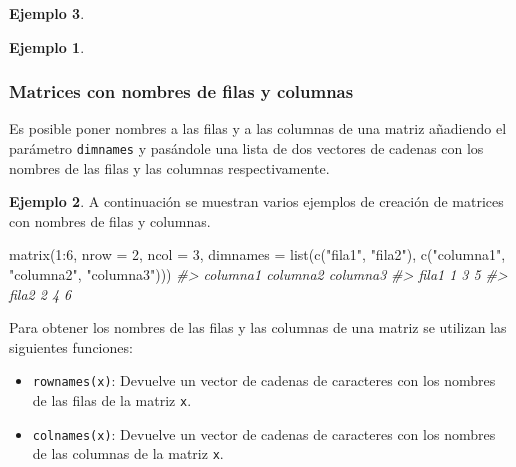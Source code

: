 \documentclass[
]{book}
\newenvironment{Shaded}{\begin{snugshade}}{\end{snugshade}}
\newcommand{\AttributeTok}[1]{\textcolor[rgb]{0.77,0.63,0.00}{#1}}
\newcommand{\CommentTok}[1]{\textcolor[rgb]{0.56,0.35,0.01}{\textit{#1}}}
\newcommand{\DecValTok}[1]{\textcolor[rgb]{0.00,0.00,0.81}{#1}}
\newcommand{\FunctionTok}[1]{\textcolor[rgb]{0.00,0.00,0.00}{#1}}
\newcommand{\NormalTok}[1]{#1}
\newcommand{\SpecialCharTok}[1]{\textcolor[rgb]{0.00,0.00,0.00}{#1}}
\newcommand{\StringTok}[1]{\textcolor[rgb]{0.31,0.60,0.02}{#1}}
\providecommand{\tightlist}{%
  \setlength{\itemsep}{0pt}\setlength{\parskip}{0pt}}
\theoremstyle{definition}
\theoremstyle{definition}
\newtheorem{example}{Ejemplo}[chapter]
\theoremstyle{definition}
\theoremstyle{definition}
\theoremstyle{remark}
\begin{document}
\begin{example}
\begin{example}
\end{example}

\hypertarget{matrices-con-nombres-de-filas-y-columnas}{%
\subsubsection{Matrices con nombres de filas y columnas}\label{matrices-con-nombres-de-filas-y-columnas}}

Es posible poner nombres a las filas y a las columnas de una matriz añadiendo el parámetro \texttt{dimnames} y pasándole una lista de dos vectores de cadenas con los nombres de las filas y las columnas respectivamente.

\begin{example}

A continuación se muestran varios ejemplos de creación de matrices con nombres de filas y columnas.

\begin{Shaded}
\begin{Highlighting}[]
\FunctionTok{matrix}\NormalTok{(}\DecValTok{1}\SpecialCharTok{:}\DecValTok{6}\NormalTok{, }\AttributeTok{nrow =} \DecValTok{2}\NormalTok{, }\AttributeTok{ncol =} \DecValTok{3}\NormalTok{, }\AttributeTok{dimnames =} \FunctionTok{list}\NormalTok{(}\FunctionTok{c}\NormalTok{(}\StringTok{"fila1"}\NormalTok{, }\StringTok{"fila2"}\NormalTok{), }\FunctionTok{c}\NormalTok{(}\StringTok{"columna1"}\NormalTok{, }\StringTok{"columna2"}\NormalTok{, }\StringTok{"columna3"}\NormalTok{)))}
\CommentTok{\#\textgreater{}       columna1 columna2 columna3}
\CommentTok{\#\textgreater{} fila1        1        3        5}
\CommentTok{\#\textgreater{} fila2        2        4        6}
\end{Highlighting}
\end{Shaded}

\end{example}

Para obtener los nombres de las filas y las columnas de una matriz se utilizan las siguientes funciones:

\begin{itemize}
\tightlist
\item
  \texttt{rownames(x)}: Devuelve un vector de cadenas de caracteres con los nombres de las filas de la matriz \texttt{x}.
\item
  \texttt{colnames(x)}: Devuelve un vector de cadenas de caracteres con los nombres de las columnas de la matriz \texttt{x}.
\end{itemize}


\end{example}
\end{document}

